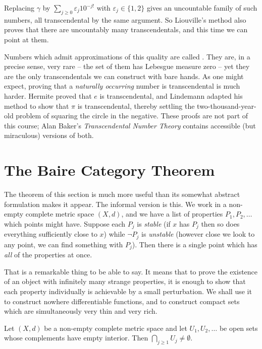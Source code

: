 \begin{remark}
	Replacing $\gamma$ by $\sum_{j\geq0}\varepsilon_j10^{-j!}$ with $\varepsilon_j\in\{1,2\}$ gives an uncountable family of such numbers, all transcendental by the same argument. So Liouville's method also proves that there are uncountably many transcendentals, and this time we can point at them.
\end{remark}

Numbers which admit approximations of this quality are called . They are, in a precise sense, very rare -- the set of them has Lebesgue measure zero -- yet they are the only transcendentals we can construct with bare hands. As one might expect, proving that a \emph{naturally occurring} number is transcendental is much harder. Hermite proved that $e$ is transcendental, and Lindemann adapted his method to show that $\pi$ is transcendental, thereby settling the two-thousand-year-old problem of squaring the circle in the negative. These proofs are not part of this course; Alan Baker's \emph{Transcendental Number Theory} contains accessible (but miraculous) versions of both.

\section{The Baire Category Theorem}

The theorem of this section is much more useful than its somewhat abstract formulation makes it appear. The informal version is this. We work in a non-empty complete metric space $(X,d)$, and we have a list of properties $P_1,P_2,\ldots$ which points might have. Suppose each $P_j$ is \emph{stable} (if $x$ has $P_j$ then so does everything sufficiently close to $x$) while $\lnot P_j$ is \emph{unstable} (however close we look to any point, we can find something with $P_j$). Then there is a single point which has \emph{all} of the properties at once.

That is a remarkable thing to be able to say. It means that to prove the existence of an object with infinitely many strange properties, it is enough to show that each property individually is achievable by a small perturbation. We shall use it to construct nowhere differentiable functions, and to construct compact sets which are simultaneously very thin and very rich.

\begin{theorem}\label{thm:baire}
	Let $(X,d)$ be a non-empty complete metric space and let $U_1,U_2,\ldots$ be open sets whose complements have empty interior. Then $\bigcap_{j\geq1}U_j\neq\emptyset$.
\end{theorem}

